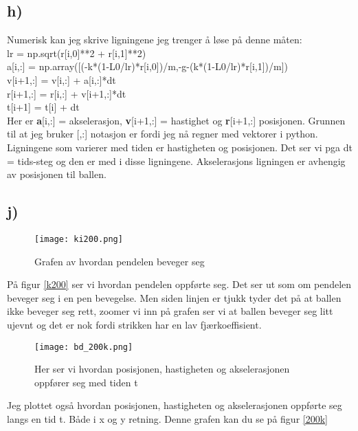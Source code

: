 \documentclass[a4paper,12pt,norsk]{article}
\begin{document}
\subsection*{h)}
Numerisk kan jeg skrive ligningene jeg trenger å løse på denne måten: \\
    lr = np.sqrt(r[i,0]**2 + r[i,1]**2)\\
    a[i,:] = np.array([(-k*(1-L0/lr)*r[i,0])/m,-g-(k*(1-L0/lr)*r[i,1])/m])\\
    v[i+1,:] = v[i,:] + a[i,:]*dt\\
    r[i+1,:] = r[i,:] + v[i+1,:]*dt\\
    t[i+1] = t[i] + dt\\
Her er \textbf{a}[i,:] = akselerasjon, \textbf{v}[i+1,:] = hastighet  og \textbf{r}[i+1,:] posisjonen. Grunnen til at jeg bruker [,:] notasjon er fordi jeg nå regner med vektorer i python. Ligningene som varierer med tiden er hastigheten og posisjonen. Det ser vi pga dt = tids-steg og den er med i disse ligningene. Akselerasjons ligningen er avhengig av posisjonen til ballen.

\subsection*{j)}

\begin{figure}[h!]
\texttt{[image: ki200.png]} 
\caption{Grafen av hvordan pendelen beveger seg}
\label{k200}
\end{figure}
På figur \vref{k200} ser vi hvordan pendelen oppførte seg. Det ser ut som om pendelen beveger seg i en pen bevegelse. Men siden linjen er tjukk tyder det på at ballen ikke beveger seg rett, zoomer vi inn på grafen ser vi at ballen beveger seg litt ujevnt og det er nok fordi strikken har en lav fjærkoeffisient.
\begin{figure}[h!]
\texttt{[image: bd\_200k.png]} 
\caption{Her ser vi hvordan posisjonen, hastigheten og akselerasjonen oppfører seg med tiden t}
\label{200k}
\end{figure}
Jeg plottet også hvordan posisjonen, hastigheten og akselerasjonen oppførte seg langs en tid t. Både i x og y retning. Denne grafen kan du se på figur \vref{200k}
\end{document}
